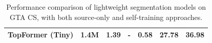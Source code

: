 \documentclass[a4paper,12pt]{report}
\begin{document}
\begin{table}[]
{\begin{tabular}{|l|l|r|l|r|r|r|}
            TopFormer (Tiny)     & 1.4M                                                      & \textbf{1.39}                                                                       & -                                                                     & 0.58                                                                                       & 27.78                                                                              & 36.98                                                                      \\ \hline
        \end{tabular}
    }
    \caption{Performance comparison of lightweight segmentation models on GTA \textrightarrow CS, with both source-only and self-training approaches.}
    \label{tab:lightweit-da-baseline}
\end{table}
\end{document}

